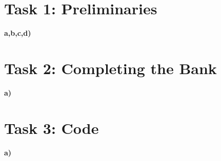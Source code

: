 \documentclass{article}
\begin{document}



\section*{\textbf{Task 1: Preliminaries}}
\vspace*{12pt}\small\textbf{a,b,c,d)}


\section*{\textbf{Task 2: Completing the Bank}}
\vspace*{12pt}\small\textbf{a)}

\section*{\textbf{Task 3: Code}}
\vspace*{12pt}\small\textbf{a)}
\end{document}
